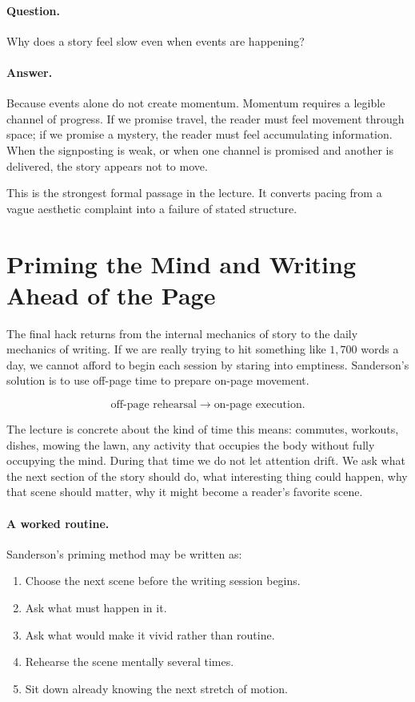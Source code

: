 \paragraph{Question.} Why does a story feel slow even when events are happening?

\paragraph{Answer.} Because events alone do not create momentum. Momentum requires a legible channel of progress. If we promise travel, the reader must feel movement through space; if we promise a mystery, the reader must feel accumulating information. When the signposting is weak, or when one channel is promised and another is delivered, the story appears not to move.

This is the strongest formal passage in the lecture. It converts pacing from a vague aesthetic complaint into a failure of stated structure.

\section{Priming the Mind and Writing Ahead of the Page}

The final hack returns from the internal mechanics of story to the daily mechanics of writing. If we are really trying to hit something like \(1{,}700\) words a day, we cannot afford to begin each session by staring into emptiness. Sanderson's solution is to use off-page time to prepare on-page movement.

\begin{equation}
\text{off-page rehearsal} \to \text{on-page execution}.
\end{equation}

The lecture is concrete about the kind of time this means: commutes, workouts, dishes, mowing the lawn, any activity that occupies the body without fully occupying the mind. During that time we do not let attention drift. We ask what the next section of the story should do, what interesting thing could happen, why that scene should matter, why it might become a reader's favorite scene.

\paragraph{A worked routine.} Sanderson's priming method may be written as:
\begin{enumerate}
\item Choose the next scene before the writing session begins.
\item Ask what must happen in it.
\item Ask what would make it vivid rather than routine.
\item Rehearse the scene mentally several times.
\item Sit down already knowing the next stretch of motion.
\end{enumerate}

